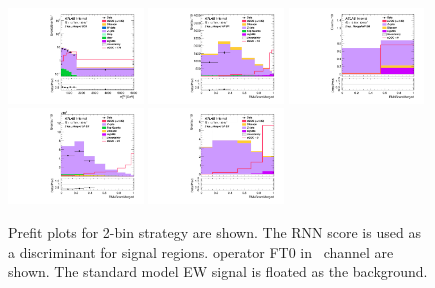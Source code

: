 \begin{figure}[ht]
    \centering
    	\includegraphics[width=0.32\textwidth]{figures/aQGC/Region_distMTagMerJets_DCRVjet_BMin0_J0_incJet1_L2_T0_incFat1_Y6051_incTag1_Fat1_Prefitlog.pdf}
    \includegraphics[width=0.32\textwidth]{figures/aQGC/Region_distRNNScoreMerged_DSRVBSHPLMVV_BMin0_J0_incJet1_L2_T0_incFat1_Y6051_incTag1_Fat1_Prefit.pdf}
 \includegraphics[width=0.32\textwidth]{figures/aQGC/Region_distRNNScoreMerged_DSRVBSHPHMVV_BMin0_J0_incJet1_L2_T0_incFat1_Y6051_incTag1_Fat1_Prefit.pdf}
\includegraphics[width=0.32\textwidth]{figures/aQGC/Region_distRNNScoreMerged_DSRVBSLPLMVV_BMin0_J0_incJet1_L2_T0_incFat1_Y6051_incTag1_Fat1_Prefit.pdf}
    \includegraphics[width=0.32\textwidth]{figures/aQGC/Region_distRNNScoreMerged_DSRVBSLPHMVV_BMin0_J0_incJet1_L2_T0_incFat1_Y6051_incTag1_Fat1_Prefit.pdf}
        \caption{Prefit plots for 2-bin strategy are shown. The RNN score is used as a discriminant for signal regions. operator FT0 in \tlep\ channel are shown. The standard model EW signal is floated as the background.}
        \label{fig:2lepTwoBin}
\end{figure}

